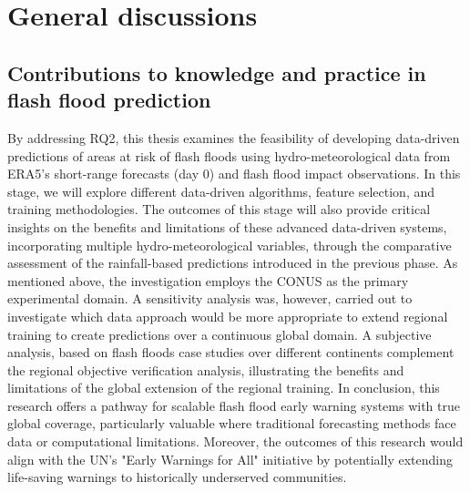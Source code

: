 \chapter{General discussions}
\label{general_discussions}
\graphicspath{{chapter_08/figures}{chapter_08/tables}}


\section{Contributions to knowledge and practice in flash flood prediction}
\label{general_introduction_contribution_to_knowledge}



 

By addressing RQ2, this thesis examines the feasibility of developing data-driven predictions of areas at risk of flash floods using hydro-meteorological data from ERA5's short-range forecasts (day 0) and flash flood impact observations. In this stage, we will explore different data-driven algorithms, feature selection, and training methodologies. The outcomes of this stage will also provide critical insights on the benefits and limitations of these advanced data-driven systems, incorporating multiple hydro-meteorological variables, through the comparative assessment of the rainfall-based predictions introduced in the previous phase. As mentioned above, the investigation employs the CONUS as the primary experimental domain. A sensitivity analysis was, however, carried out to investigate which data approach would be more appropriate to extend regional training to create predictions over a continuous global domain. A subjective analysis, based on flash floods case studies over different continents complement the regional objective verification analysis, illustrating the benefits and limitations of the global extension of the regional training. In conclusion, this research offers a pathway for scalable flash flood early warning systems with true global coverage, particularly valuable where traditional forecasting methods face data or computational limitations. Moreover, the outcomes of this research would align with the UN's "Early Warnings for All" initiative by potentially extending life-saving warnings to historically underserved communities.

